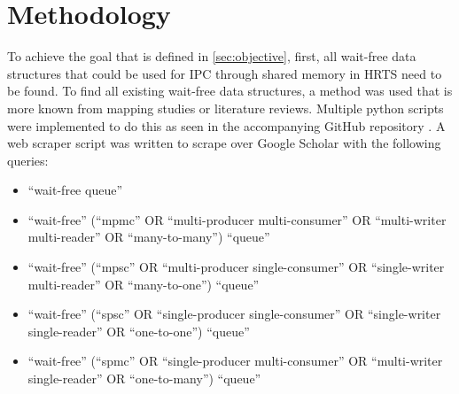 \chapter{Methodology}\label{ch:methodology}
To achieve the goal that is defined in \cref{sec:objective}, first, all wait-free data structures that could be used for \ac{IPC} through shared memory in \ac{HRTS} need to be found. To find all existing wait-free data structures, a method was used that is more known from mapping studies or literature reviews. Multiple python scripts were implemented to do this as seen in the accompanying GitHub repository \cite{githubMA}. A web scraper script was written to scrape over Google Scholar with the following queries:
\begin{itemize}
   \item \enquote{wait-free queue}
   \item \enquote{wait-free} (\enquote{mpmc} OR \enquote{multi-producer multi-consumer} OR \enquote{multi-writer multi-reader} OR \enquote{many-to-many}) \enquote{queue}
   \item \enquote{wait-free} (\enquote{mpsc} OR \enquote{multi-producer single-consumer} OR \enquote{single-writer multi-reader} OR \enquote{many-to-one}) \enquote{queue}
   \item \enquote{wait-free} (\enquote{spsc} OR \enquote{single-producer single-consumer} OR \enquote{single-writer single-reader} OR \enquote{one-to-one}) \enquote{queue}
   \item \enquote{wait-free} (\enquote{spmc} OR \enquote{single-producer multi-consumer} OR \enquote{multi-writer single-reader} OR \enquote{one-to-many}) \enquote{queue}
\end{itemize}
